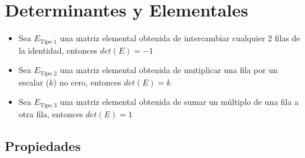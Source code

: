 \documentclass[12pt, fleqn]{report}                             %
\theoremstyle{break}                                            %
\begin{document}
        \clearpage
        \section{Determinantes y Elementales}

            \begin{itemize}
                
                \item 
                    Sea $E_{\text{Tipo 1}}$ una matriz elemental obtenida de intercambiar
                    cualquier 2 filas de la identidad, entonces $det(E) = -1$

                \item 
                    Sea $E_{\text{Tipo 2}}$ una matriz elemental obtenida de mutiplicar
                    una fila por un escalar ($k$) no cero, entonces $det(E) = k$

                \item 
                    Sea $E_{\text{Tipo 3}}$ una matriz elemental obtenida de sumar
                    un múltiplo de una fila a otra fila, entonces $det(E) = 1$

            \end{itemize}


            \clearpage
            \subsection{Propiedades}
\end{document}
